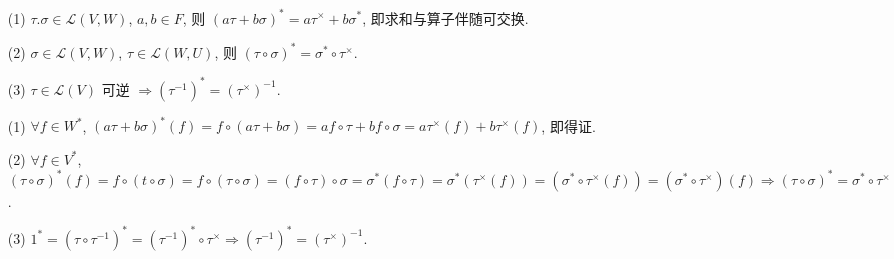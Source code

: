 \documentclass{note}
\begin{document}
\begin{thm}[(课本定理 3.18)]
    \begin{itemize}
        \item[(1)] $\tau.\sigma\in\mathcal{L}(V,W)$, $a,b\in F$, 则 $(a\tau+b\sigma)^*=a\tau^{\times}+b\sigma^*$, 即求和与算子伴随可交换.
        \item[(2)] $\sigma\in\mathcal{L}(V,W)$, $\tau\in\mathcal{L}(W,U)$, 则 $(\tau\circ\sigma)^*=\sigma^*\circ\tau^{\times}$.
        \item[(3)] $\mathcal{\tau}\in\mathcal{L}(V)$ 可逆 $\Longrightarrow(\tau^{-1})^*=(\tau^{\times})^{-1}$.
    \end{itemize}
\end{thm}
\begin{pf}
    \begin{itemize}
        \item[(1)] $\forall f\in W^*$, $(a\tau+b\sigma)^*(f)=f\circ(a\tau+b\sigma)=af\circ\tau+bf\circ\sigma=a\tau^{\times}(f)+b\tau^{\times}(f)$, 即得证.
        \item[(2)] $\forall f\in V^*$, $(\tau\circ\sigma)^*(f)=f\circ(t\circ\sigma)=f\circ(\tau\circ\sigma)=(f\circ\tau)\circ\sigma=\sigma^*(f\circ\tau)=\sigma^*(\tau^{\times}(f))=(\sigma^*\circ\tau^{\times}(f))=(\sigma^*\circ\tau^{\times})(f)\Longrightarrow(\tau\circ\sigma)^*=\sigma^*\circ\tau^{\times}$.
        \begin{center}
        \end{center}
        \item[(3)] $1^*=(\tau\circ\tau^{-1})^*=(\tau^{-1})^*\circ\tau^{\times}\Longrightarrow(\tau^{-1})^*=(\tau^{\times})^{-1}$.
    \end{itemize}
\end{pf}
\end{document}
